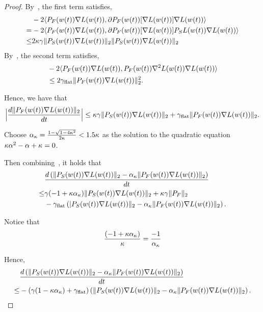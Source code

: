 \begin{proof}
    By~, the first term satisfies,
    \begin{align*}
        &-2\langle {P}_F(w(t)) \nabla L(w(t)), \partial {P}_F(w(t))[\nabla L(w(t))] \nabla L(w(t)) \rangle \\
        =& -2\langle {P}_F(w(t)) \nabla L(w(t)), \partial {P}_F(w(t))[\nabla L(w(t))] {P}_S L(w(t)) \nabla L(w(t)) \rangle \\
        \le& 2 \kappa \gamma \|{P}_S(w(t)) \nabla L(w(t))\|_2 \|{P}_S(w(t)) \nabla L(w(t))\|_2
    \end{align*}
    By~, the second term satisfies,
    \begin{align*}
        &-2 \langle {P}_F(w(t)) \nabla L(w(t)), {P}_F(w(t)) \nabla^2 L(w(t)) \nabla L(w(t))\rangle \\
        &\le 2\gamma_{\mathrm{flat}} \| {P}_F(w(t)) \nabla L(w(t))\|_2^2.
    \end{align*}

    Hence, we have that
    \begin{align}
    \label{eq:fgf}
         \Big| \frac{d \|{P}_F(w(t)) \nabla L(w(t))\|_2}{dt} \Big| \le \kappa \gamma \|{P}_S(w(t)) \nabla L(w(t))\|_2 + \gamma_{\mathrm{flat}} \| {P}_F(w(t)) \nabla L(w(t))\|_2.
    \end{align}

    Choose $\alpha_\kappa = \frac{1 - \sqrt{1 - 4 \kappa^2}}{2 \kappa} < 1.5 \kappa$ as the solution to the quadratic equation $\kappa \alpha^2 -  \alpha + \kappa = 0$.

    Then combining~, it holds that
    \begin{align*}
        &\frac{d \left( \| {P}_S(w(t)) \nabla L(w(t))\|_2 - \alpha_{\kappa} \|{P}_F(w(t)) \nabla L(w(t))\|_2\right)} {dt} \\ \le&  \gamma ( -1 + \kappa \alpha_{\kappa}) \|{P}_S(w(t)) \nabla L(w(t)) \|_2 + \kappa \gamma \| {P}_F \|_2\\
        &-\gamma_{\mathrm{flat}} \left(| {P}_S(w(t)) \nabla L(w(t))\|_2 - \alpha_{\kappa} \|{P}_F(w(t)) \nabla L(w(t))\|_2 \right).
    \end{align*}

    Notice that
    \begin{align*}
         \frac{( -1 + \kappa \alpha_{\kappa})}{\kappa} = \frac{-1}{\alpha_{\kappa}}
    \end{align*}

    Hence,
    \begin{align*}
         &\frac{d \left( \| {P}_S(w(t)) \nabla L(w(t))\|_2 - \alpha_{\kappa} \|{P}_F(w(t)) \nabla L(w(t))\|_2\right)} {dt}\\ \le& -( \gamma(1 - \kappa \alpha_{\kappa}) + \gamma_{\mathrm{flat}} ) \left( \| {P}_S(w(t)) \nabla L(w(t))\|_2 - \alpha_{\kappa} \|{P}_F(w(t)) \nabla L(w(t))\|_2\right).
    \end{align*}


\end{proof}
